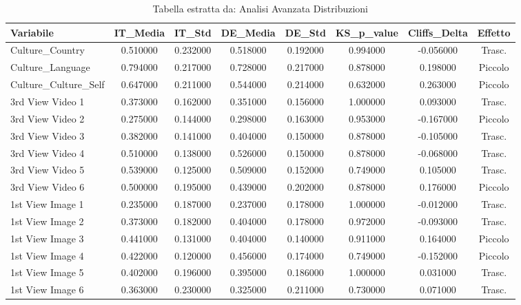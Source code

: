 \begin{table}[htbp]
\caption{Tabella estratta da: Analisi Avanzata Distribuzioni}
\label{tab:analisi_avanzata_distribuzioni}
\begin{tabular}{lccccccc}
\toprule
Variabile & IT\_Media & IT\_Std & DE\_Media & DE\_Std & KS\_p\_value & Cliffs\_Delta & Effetto \\
\midrule
Culture\_Country & 0.510000 & 0.232000 & 0.518000 & 0.192000 & 0.994000 & -0.056000 & Trasc. \\
Culture\_Language & 0.794000 & 0.217000 & 0.728000 & 0.217000 & 0.878000 & 0.198000 & Piccolo \\
Culture\_Culture\_Self & 0.647000 & 0.211000 & 0.544000 & 0.214000 & 0.632000 & 0.263000 & Piccolo \\
3rd View Video 1 & 0.373000 & 0.162000 & 0.351000 & 0.156000 & 1.000000 & 0.093000 & Trasc. \\
3rd View Video 2 & 0.275000 & 0.144000 & 0.298000 & 0.163000 & 0.953000 & -0.167000 & Piccolo \\
3rd View Video 3 & 0.382000 & 0.141000 & 0.404000 & 0.150000 & 0.878000 & -0.105000 & Trasc. \\
3rd View Video 4 & 0.510000 & 0.138000 & 0.526000 & 0.150000 & 0.878000 & -0.068000 & Trasc. \\
3rd View Video 5 & 0.539000 & 0.125000 & 0.509000 & 0.152000 & 0.749000 & 0.105000 & Trasc. \\
3rd View Video 6 & 0.500000 & 0.195000 & 0.439000 & 0.202000 & 0.878000 & 0.176000 & Piccolo \\
1st View Image 1 & 0.235000 & 0.187000 & 0.237000 & 0.178000 & 1.000000 & -0.012000 & Trasc. \\
1st View Image 2 & 0.373000 & 0.182000 & 0.404000 & 0.178000 & 0.972000 & -0.093000 & Trasc. \\
1st View Image 3 & 0.441000 & 0.131000 & 0.404000 & 0.140000 & 0.911000 & 0.164000 & Piccolo \\
1st View Image 4 & 0.422000 & 0.120000 & 0.456000 & 0.174000 & 0.749000 & -0.152000 & Piccolo \\
1st View Image 5 & 0.402000 & 0.196000 & 0.395000 & 0.186000 & 1.000000 & 0.031000 & Trasc. \\
1st View Image 6 & 0.363000 & 0.230000 & 0.325000 & 0.211000 & 0.730000 & 0.071000 & Trasc. \\
\bottomrule
\end{tabular}
\end{table}
